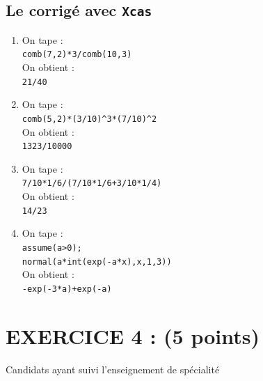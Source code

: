 \documentclass[a4paper,11pt]{book}
\begin{document}
\subsection{Le corrig\'e avec {\tt Xcas}}
\begin{enumerate}
\item On tape :\\
{\tt comb(7,2)*3/comb(10,3)}\\
On obtient :\\
{\tt 21/40}\\
\item On tape :\\
{\tt comb(5,2)*(3/10)\verb|^|3*(7/10)\verb|^|2}\\
On obtient :\\
{\tt 1323/10000}\\
\item On tape :\\
{\tt 7/10*1/6/(7/10*1/6+3/10*1/4)}\\
On obtient :\\
{\tt 14/23}\\
\item On tape :\\
{\tt assume(a>0);}\\
{\tt normal(a*int(exp(-a*x),x,1,3))}\\
On obtient :\\
{\tt -exp(-3*a)+exp(-a)}\\

\end{enumerate}

\newpage 
\section{EXERCICE 4 : (5 points)}
 Candidats ayant suivi l'enseignement de sp\'ecialit\'e
\end{document}
